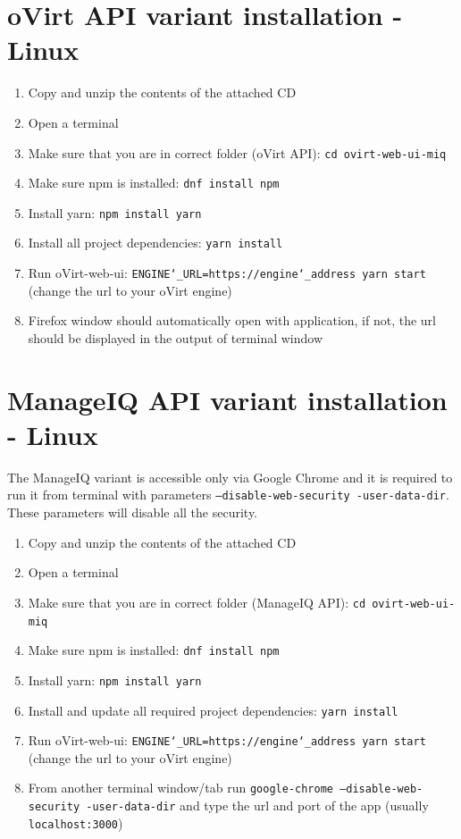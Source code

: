 \section{oVirt API variant installation - Linux}
\begin{enumerate}

\item Copy and unzip the contents of the attached CD 
\item Open a terminal
\item Make sure that you are in correct folder (oVirt API): \texttt{cd ovirt-web-ui-miq}
\item Make sure npm is installed: \texttt{dnf install npm}
\item Install yarn: \texttt{npm install yarn}
\item Install all project dependencies: \texttt{yarn install}
\item Run oVirt-web-ui: \texttt{ENGINE\char`_URL=https://engine\char`_address yarn start} (change the url to your oVirt engine)
\item Firefox window should automatically open with application, if not, the url should be displayed in the output of terminal window
\end{enumerate} 

\newpage
\section{ManageIQ API variant installation - Linux}
The ManageIQ variant is accessible only via Google Chrome and it is required to run it from terminal with parameters \texttt{--disable-web-security -user-data-dir}. These parameters will disable all the security.
\begin{enumerate}

\item Copy and unzip the contents of the attached CD 
\item Open a terminal
\item Make sure that you are in correct folder (ManageIQ API): \texttt{cd ovirt-web-ui-miq}
\item Make sure npm is installed: \texttt{dnf install npm}
\item Install yarn: \texttt{npm install yarn}
\item Install and update all required project dependencies: \texttt{yarn install}
\item Run oVirt-web-ui: \texttt{ENGINE\char`_URL=https://engine\char`_address yarn start} (change the url to your oVirt engine)
\item From another terminal window/tab run \texttt{google-chrome --disable-web-security -user-data-dir} and type the url and port of the app (usually \texttt{localhost:3000})
\end{enumerate} 

